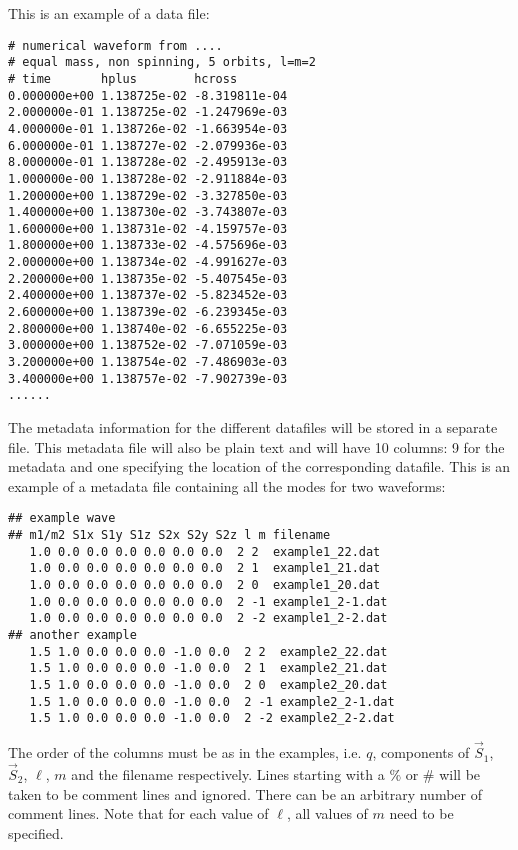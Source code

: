 \documentclass[10pt]{ligodcc}
\begin{document}
This is an example of a data file:

\begin{verbatim}
# numerical waveform from ....
# equal mass, non spinning, 5 orbits, l=m=2
# time       hplus        hcross
0.000000e+00 1.138725e-02 -8.319811e-04
2.000000e-01 1.138725e-02 -1.247969e-03
4.000000e-01 1.138726e-02 -1.663954e-03
6.000000e-01 1.138727e-02 -2.079936e-03
8.000000e-01 1.138728e-02 -2.495913e-03
1.000000e-00 1.138728e-02 -2.911884e-03
1.200000e+00 1.138729e-02 -3.327850e-03
1.400000e+00 1.138730e-02 -3.743807e-03
1.600000e+00 1.138731e-02 -4.159757e-03
1.800000e+00 1.138733e-02 -4.575696e-03
2.000000e+00 1.138734e-02 -4.991627e-03
2.200000e+00 1.138735e-02 -5.407545e-03
2.400000e+00 1.138737e-02 -5.823452e-03
2.600000e+00 1.138739e-02 -6.239345e-03
2.800000e+00 1.138740e-02 -6.655225e-03
3.000000e+00 1.138752e-02 -7.071059e-03
3.200000e+00 1.138754e-02 -7.486903e-03
3.400000e+00 1.138757e-02 -7.902739e-03
......
\end{verbatim}

The metadata information for the different datafiles will be stored in
a separate file.  This metadata file will also be plain text and
will have 10 columns: 9 for the metadata and one specifying
the location of the corresponding datafile.  This is an example of a
metadata file containing all the modes for two waveforms:
\begin{verbatim}
## example wave
## m1/m2 S1x S1y S1z S2x S2y S2z l m filename
   1.0 0.0 0.0 0.0 0.0 0.0 0.0  2 2  example1_22.dat
   1.0 0.0 0.0 0.0 0.0 0.0 0.0  2 1  example1_21.dat
   1.0 0.0 0.0 0.0 0.0 0.0 0.0  2 0  example1_20.dat
   1.0 0.0 0.0 0.0 0.0 0.0 0.0  2 -1 example1_2-1.dat
   1.0 0.0 0.0 0.0 0.0 0.0 0.0  2 -2 example1_2-2.dat
## another example
   1.5 1.0 0.0 0.0 0.0 -1.0 0.0  2 2  example2_22.dat
   1.5 1.0 0.0 0.0 0.0 -1.0 0.0  2 1  example2_21.dat
   1.5 1.0 0.0 0.0 0.0 -1.0 0.0  2 0  example2_20.dat
   1.5 1.0 0.0 0.0 0.0 -1.0 0.0  2 -1 example2_2-1.dat
   1.5 1.0 0.0 0.0 0.0 -1.0 0.0  2 -2 example2_2-2.dat
\end{verbatim}
The order of the columns must be as in the examples, i.e. $q$,
components of $\vec{S}_1$, $\vec{S}_2$, $\ell$, $m$ and the filename
respectively.  Lines starting with a $\%$ or $\#$ will be taken to be
comment lines and ignored.  There can be an arbitrary number of
comment lines.  Note that for each value of $\ell$, all values of $m$
need to be specified.
\end{document}
